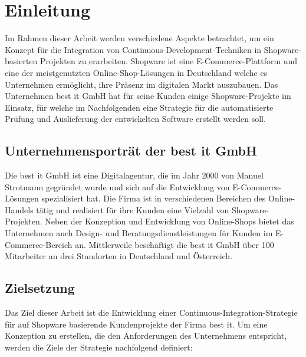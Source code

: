 
\section{Einleitung} \label{sec:01-introduction}

Im Rahmen dieser Arbeit werden verschiedene Aspekte betrachtet, um ein Konzept für die Integration von
Continuous-Development-Techniken in Shopware-basierten Projekten zu erarbeiten.
Shopware ist eine E-Commerce-Plattform und eine der meistgenutzten Online-Shop-Lösungen in
Deutschland welche es Unternehmen ermöglicht, ihre Präsenz im digitalen Markt
auszubauen.
Das Unternehmen best it GmbH hat für seine Kunden einige Shopware-Projekte im Einsatz, für welche im Nachfolgenden
eine Strategie für die automatisierte Prüfung und Auslieferung der entwickelten Software erstellt werden soll.

\subsection{Unternehmensporträt der best it GmbH} \label{subsec:01-introduction-1}

Die best it GmbH ist eine Digitalagentur, die im Jahr 2000 von Manuel Strotmann gegründet wurde und sich auf die
Entwicklung von E-Commerce-Lösungen spezialisiert hat.
Die Firma ist in verschiedenen Bereichen des Online-Handels tätig und realisiert für ihre Kunden eine Vielzahl von
Shopware-Projekten.
Neben der Konzeption und Entwicklung von Online-Shops bietet das Unternehmen auch Design- und
Beratungsdienstleistungen für Kunden im E-Commerce-Bereich an.
Mittlerweile beschäftigt die best it GmbH über 100 Mitarbeiter an drei Standorten in Deutschland und Österreich.

\subsection{Zielsetzung} \label{subsec:01-introduction-2}

Das Ziel dieser Arbeit ist die Entwicklung einer Continuous-Integration-Strategie für auf Shopware basierende
Kundenprojekte der Firma best it.
Um eine Konzeption zu erstellen, die den Anforderungen des Unternehmens entspricht, werden die Ziele der Strategie
nachfolgend definiert:

